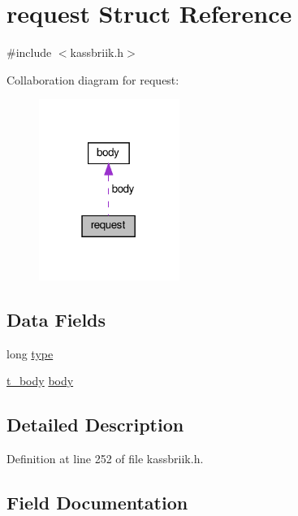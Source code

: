 \hypertarget{structrequest}{}\section{request Struct Reference}
\label{structrequest}


{\ttfamily \#include $<$kassbriik.\+h$>$}



Collaboration diagram for request\+:\nopagebreak
\begin{figure}[H]
\begin{center}
\leavevmode
\includegraphics[width=130pt]{structrequest__coll__graph}
\end{center}
\end{figure}
\subsection*{Data Fields}
\begin{DoxyCompactItemize}
\item 
long \hyperlink{structrequest_a6a83a8677f7c78fd146859325e08209a}{type}
\item 
\hyperlink{structt__body}{t\+\_\+body} \hyperlink{structrequest_ab79c1a13ebd161031c617d5f313e3cae}{body}
\end{DoxyCompactItemize}


\subsection{Detailed Description}


Definition at line 252 of file kassbriik.\+h.



\subsection{Field Documentation}
\mbox{\label{structrequest_ab79c1a13ebd161031c617d5f313e3cae}} 
